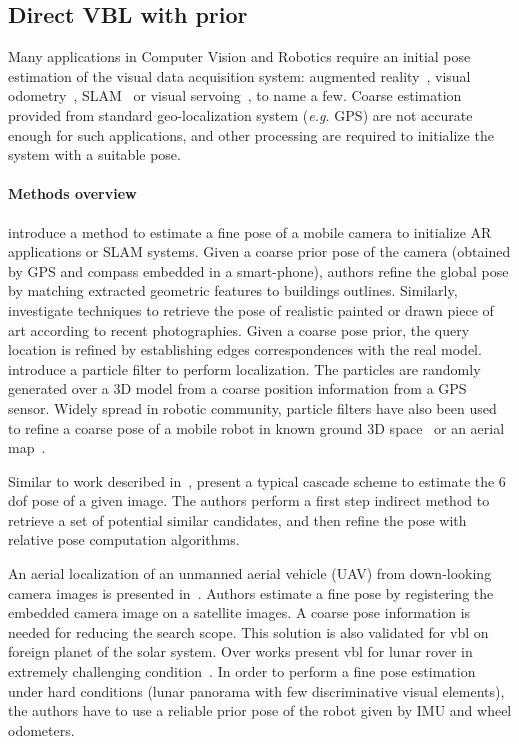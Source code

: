 \subsection{Direct VBL with prior}
\label{vbl_prior}
Many applications in Computer Vision and Robotics require an initial  pose estimation of the visual data acquisition system: augmented reality~\citep{Arth2015}, visual odometry~\citep{Pascoe2015a}, SLAM~\citep{Milford2012} or visual servoing~\citep{Marchand2016}, to name a few. Coarse estimation provided from standard geo-localization system (\textit{e.g.} GPS) are not accurate enough for such applications, and other processing are required to initialize the system with a suitable pose.

\paragraph{Methods overview}
\citet{Arth2015} introduce a method to estimate a fine pose of a mobile camera to initialize AR applications or SLAM systems. Given a coarse prior pose of the camera (obtained by GPS and compass embedded in a smart-phone), authors refine the global pose by matching extracted geometric features to buildings outlines. Similarly, \citet{Russell2011} investigate techniques to retrieve the pose of realistic painted or drawn piece of art according to recent photographies. Given a coarse pose prior, the query location is refined by establishing edges correspondences with the real model. \citet{Poglitsch2015} introduce a particle filter to perform localization. The particles are randomly generated over a 3D model from a coarse position information from a GPS sensor. Widely spread in robotic community, particle filters have also been used to refine a coarse pose of a mobile robot in known ground 3D space~\citep{Mason2011} or an aerial map~\citep{Christie2016,Brubaker2016}.

Similar to work described in~\citep{Rubio2015,Sattler2017}, \citet{Song2016} present a typical cascade scheme to estimate the 6 \ac{dof} pose of a given image. The authors perform a first step indirect method to retrieve a set of potential similar candidates, and then refine the pose with relative pose computation algorithms. 

An aerial localization of an unmanned aerial vehicle (UAV) from down-looking camera images is presented in~\citep{Wan2016}. Authors estimate a fine pose by registering the embedded camera image on a satellite images. A coarse pose information is needed for reducing the search scope. This solution is also validated for \ac{vbl} on foreign planet of the solar system. Over works present \ac{vbl} for lunar rover in extremely challenging condition~\citep{Wan2014}. In order to perform a fine pose estimation under hard conditions (lunar panorama with few discriminative visual elements), the authors have to use a reliable prior pose of the robot given by IMU and wheel odometers.

